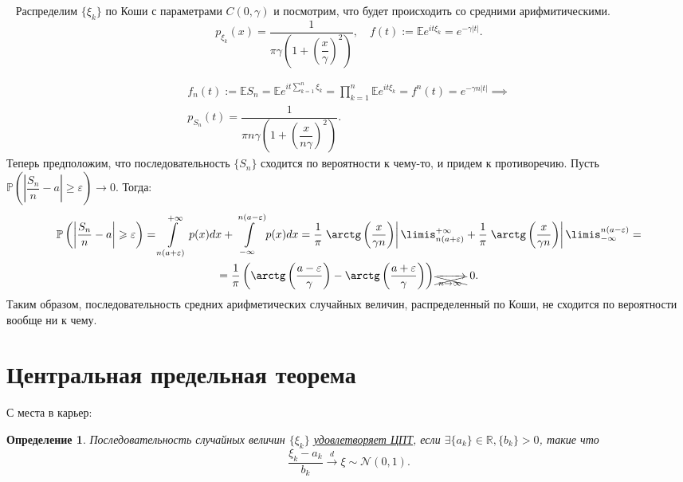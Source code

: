 \documentclass[12pt]{article}
\newtheorem{Def}{Определение}
\newenvironment{Ex}{{\bf Пример}\ }{}
\numberwithin{Th}{section}
\numberwithin{Def}{section}
\numberwithin{Lem}{section}
\numberwithin{St}{section}
\numberwithin{equation}{section}
\newcommand\Pro{\mathbb{P}} %
\newcommand\Real{\mathbb{R}} %
\newcommand\Expec{\mathbb{E}} %
\newcommand\Norm{\mathcal{N}} %
\begin{document}
\begin{Ex}
    Распределим $\{ \xi_k \}$ по Коши с параметрами $C(0, \gamma)$ и посмотрим, что будет происходить со средними арифмитическими.
    \[
        p_{\xi_k} (x) = \dfrac{1}{\pi \gamma \left( 1 + \left( \dfrac{x}{\gamma} \right) ^2 \right) }, \quad
        f(t) :=  \Expec e^{it\xi_k} = e^{-\gamma \left| t \right| }
    .\]

    \begin{multline*}
        f_n(t) := \Expec S_n = 
        \Expec e^{it \sum\limits_{k=1}^{n} \xi_k} = 
        \prod\limits_{k=1}^{n} \Expec e^{it\xi_k} = 
        f^{n} \left( t \right) =
        e^{-\gamma n \left| t \right| } \implies \\
        p_{S_n} \left( t \right) = \dfrac{1}{\pi n \gamma \left( 1 + \left( \dfrac{x}{n \gamma} \right)^2 \right) }
    .\end{multline*}
    Теперь предположим, что последовательность $\{ S_n \} $ сходится по вероятности к чему-то, и придем к противоречию.
    Пусть $\Pro \left( \left| \dfrac{S_n}{n} - a \right| \geqslant \varepsilon \right) \rightarrow 0$. Тогда:
    \begin{multline*}
        \Pro \left( \left| \dfrac{S_n}{n} - a \right| \geqslant \varepsilon \right) = \int\limits_{n(a+\varepsilon)}^{+\infty} p(x)dx + \int\limits_{-\infty}^{n(a - \varepsilon)} p(x)dx = 
        \dfrac{1}{\pi} \left. \arctg \left( \dfrac{x}{\gamma n} \right) \right|\limis_{n(a+\varepsilon)}^{+\infty} + 
        \dfrac{1}{\pi} \left. \arctg \left( \dfrac{x}{\gamma n} \right) \right|\limis_{-\infty}^{n(a - \varepsilon)} = \\
        = \dfrac{1}{\pi} \left( \arctg \left( \dfrac{a - \varepsilon}{\gamma} \right) - \arctg \left( \dfrac{a + \varepsilon}{\gamma} \right)  \right) 
        \xcancel{ \xrightarrow[n \rightarrow \infty]{}} \ 0
    .\end{multline*}
    Таким образом, последовательность средних арифметических случайных величин, распределенный по Коши, не сходится по вероятности вообще ни к чему.
\end{Ex} 

\newpage
\section{Центральная предельная теорема}

С места в карьер:

\begin{Def}
    Последовательность случайных величин $\{ \xi_k \}$ \uline{удовлетворяет ЦПТ}, если $\exists \{ a_k \} \in \Real, \{ b_k \} > 0$, такие что 
    \[
        \dfrac{\xi_k - a_k}{b_k} \xrightarrow[]{d} \xi \sim \Norm(0, 1)
    .\] 
\end{Def}
\end{document}
